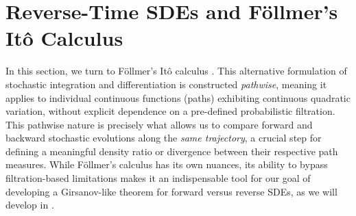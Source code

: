 
\section{Reverse-Time SDEs and F{\"o}llmer's Itô Calculus}
\label{sec:folmer_ito_calculus}

In this section, we turn to F{\"o}llmer's Itô calculus \parencite{follmer2006calcul}. This alternative formulation of stochastic integration and differentiation is constructed \emph{pathwise}, meaning it applies to individual continuous functions (paths) exhibiting continuous quadratic variation, without explicit dependence on a pre-defined probabilistic filtration. This pathwise nature is precisely what allows us to compare forward and backward stochastic evolutions along the \emph{same trajectory}, a crucial step for defining a meaningful density ratio or divergence between their respective path measures. While F{\"o}llmer's calculus has its own nuances, its ability to bypass filtration-based limitations makes it an indispensable tool for our goal of developing a Girsanov-like theorem for forward versus reverse SDEs, as we will develop in .

